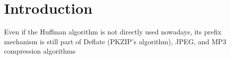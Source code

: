 \section{Introduction}
Even if the Huffman algorithm is not directly used nowadays, its prefix mechanism is still part of Deflate (PKZIP's algorithm), JPEG, and MP3 compression algorithms

